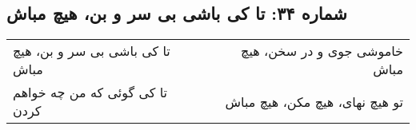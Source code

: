 \begin{center}
\section*{شماره ۳۴: تا کی باشی بی سر و بن، هیچ مباش}
\label{sec:034}
\begin{longtable}{l p{0.5cm} r}
تا کی باشی بی سر و بن، هیچ مباش
&&
خاموشی جوی و در سخن، هیچ مباش
\\
تا کی گوئی که من چه خواهم کردن
&&
تو هیچ نهای، هیچ مکن، هیچ مباش
\\
\end{longtable}
\end{center}

